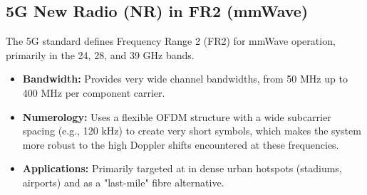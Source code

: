 \subsection{5G New Radio (NR) in FR2 (mmWave)}

The 5G standard defines Frequency Range 2 (FR2) for mmWave operation, primarily in the 24, 28, and 39 GHz bands.
\begin{itemize}
    \item \textbf{Bandwidth:} Provides very wide channel bandwidths, from 50 MHz up to 400 MHz per component carrier.
    \item \textbf{Numerology:} Uses a flexible OFDM structure with a wide subcarrier spacing (e.g., 120 kHz) to create very short symbols, which makes the system more robust to the high Doppler shifts encountered at these frequencies.
    \item \textbf{Applications:} Primarily targeted at  in dense urban hotspots (stadiums, airports) and  as a "last-mile" fibre alternative.
\end{itemize}


